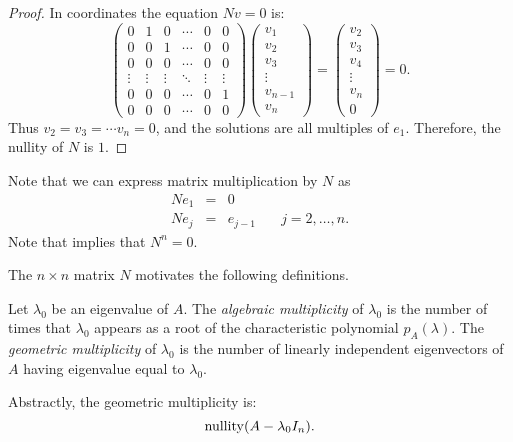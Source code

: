 \documentclass{ximera}
\begin{document}
\begin{proof}  In coordinates the equation $Nv=0$ is:
\[
\left(\begin{array}{cccccc} 0 & 1 & 0 & \cdots & 0 & 0\\
	0 & 0 & 1 & \cdots & 0 & 0 \\
	0 & 0 & 0  & \cdots & 0 & 0\\
	\vdots & \vdots & \vdots & \ddots & \vdots & \vdots\\
	0 & 0 & 0 & \cdots & 0 & 1 \\
	0 & 0 & 0 & \cdots & 0 & 0 \end{array}\right)
\left(\begin{array}{l} v_1 \\ v_2 \\ v_3 \\ \vdots \\ v_{n-1} \\v_n
	\end{array}\right) 
= \left(\begin{array}{l} v_2 \\ v_3 \\ v_4 \\ \vdots \\ v_n \\ 0
	\end{array}\right) = 0.
\]
Thus $v_2 = v_3 = \cdots v_n = 0$, and the solutions are all multiples 
of $e_1$.  Therefore, the nullity of $N$ is $1$.  \end{proof}

Note that we can express matrix multiplication by $N$ as
\begin{equation}  \label{e:Ndef}
\begin{array}{rcll} 
Ne_1 & = & 0 & \\
Ne_j & = & e_{j-1} & \quad j=2,\ldots,n .
\end{array}
\end{equation}
Note that  implies that $N^n=0$.

The $n\times n$ matrix $N$ motivates the following definitions.  
\begin{Def} \label{D:multiplicities}
Let $\lambda_0$ be an eigenvalue of $A$.  The {\em algebraic multiplicity\/} 
 of $\lambda_0$ is the number of times 
that $\lambda_0$ appears as a root of the characteristic polynomial 
$p_A(\lambda)$.  The {\em geometric multiplicity\/} 
 of $\lambda_0$ is the number of linearly 
independent eigenvectors of $A$ having eigenvalue equal to $\lambda_0$.
\end{Def}  
Abstractly, the geometric multiplicity is:
\[
{\rm nullity}(A-\lambda_0I_n).
\]
\end{document}
